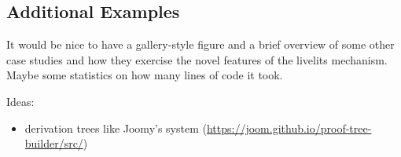 \subsection{Additional Examples}\label{sec:additional-examples}
It would be nice to have a gallery-style figure and a brief overview of some other case studies
and how they exercise the novel features of the livelits mechanism. Maybe some statistics on how
many lines of code it took.

Ideas:
\begin{itemize}
  \item derivation trees like Joomy's system (\url{https://joom.github.io/proof-tree-builder/src/})
\end{itemize}